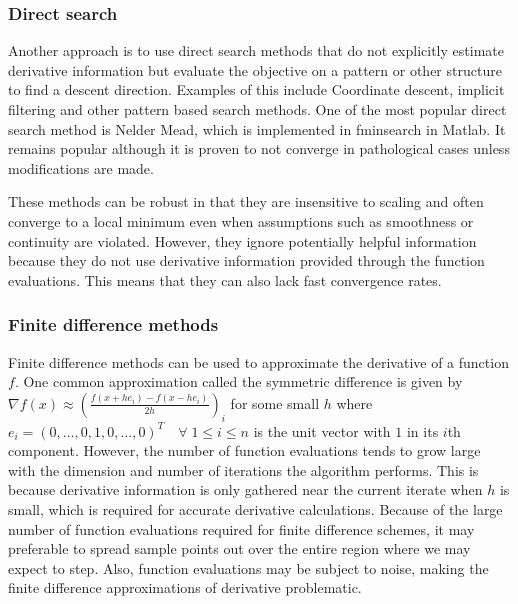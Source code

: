 \documentclass{article}
\begin{document}
\subsubsection{Direct search}


Another approach is to use direct search methods that do not explicitly estimate derivative information but evaluate the objective on a pattern or other structure to find a descent direction.
Examples of this include Coordinate descent, implicit filtering and other pattern based search methods.
One of the most popular direct search method is Nelder Mead, which is implemented in fminsearch in Matlab.
It remains popular although it is proven to not converge in pathological cases unless modifications are made.

These methods can be robust in that they are insensitive to scaling and often converge to a local minimum even when assumptions such as smoothness or continuity are violated.
However, they ignore potentially helpful information because they do not use derivative information provided through the function evaluations.
This means that they can also lack fast convergence rates.


\subsubsection{Finite difference methods}

Finite difference methods can be used to approximate the derivative of a function $f$.
One common approximation called the symmetric difference is given by $\nabla f(x) \approx (\frac{f(x+he_i) - f(x-he_i)}{2h})_i$ for some small $h$ where $e_i = (0,\ldots, 0, 1, 0, \ldots, 0)^T \quad \forall \; 1 \le i \le n$ is the unit vector with $1$ in its $i$th component.
However, the number of function evaluations tends to grow large with the dimension and number of iterations the algorithm performs.
This is because derivative information is only gathered near the current iterate when $h$ is small, which is required for accurate derivative calculations.
Because of the large number of function evaluations required for finite difference schemes, it may preferable to spread sample points out over the entire region where we may expect to step.
Also, function evaluations may be subject to noise, making the finite difference approximations of derivative problematic.
\end{document}

